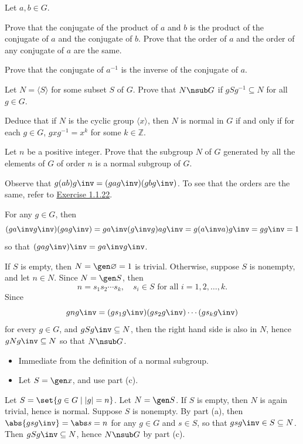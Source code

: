 \newpage

\begin{exercise}\label{ex3.1.26} 
    Let $a,b \in G$.
    \begin{subproblems}
        \item Prove that the conjugate of the product of $a$ and $b$ is the product of the conjugate of $a$ and the conjugate of $b$. Prove that the order of $a$ and the order of any conjugate of $a$ are the same.
        \item Prove that the conjugate of $a^{-1}$ is the inverse of the conjugate of $a$.
        \item Let $N = \langle S \rangle$ for some subset $S$ of $G$. Prove that $N \nsub G$ if $gSg^{-1} \subseteq N$ for all $g \in G$.
        \item Deduce that if $N$ is the cyclic group $\langle x \rangle$, then $N$ is normal in $G$ if and only if for each $g \in G$, $gxg^{-1} = x^k$ for some $k \in \mathbb{Z}$.
        \item Let $n$ be a positive integer. Prove that the subgroup $N$ of $G$ generated by all the elements of $G$ of order $n$ is a normal subgroup of $G$.
    \end{subproblems}
\end{exercise}

\begin{solalph}
    \item Observe that $g(ab)g\inv = (gag\inv)(gbg\inv)$. To see that the orders are the same, refer to \hyperref[ex1.1.22]{Exercise 1.1.22}.
    \item For any $g \in G$, then
    \[(ga\inv g\inv)(gag\inv) = ga\inv (g\inv g) ag\inv = g(a\inv a)g\inv = gg\inv = 1\]
    so that $(gag\inv)\inv = ga\inv g\inv$.
    \item If $S$ is empty, then $N = \gen\varnothing = 1$ is trivial. Otherwise, suppose $S$ is nonempty, and let $n \in N$. Since $N = \gen S$, then
    \[n = s_1s_2 \cdots s_k, \quad s_i \in S \text{ for all } i = 1, 2, \ldots, k.\]
    Since
    \[gng\inv = (gs_1g\inv)(gs_2g\inv) \cdots (gs_kg\inv)\]
    for every $g \in G$, and $gSg\inv \subseteq N$, then the right hand side is also in $N$, hence $gNg\inv \subseteq N$ so that $N \nsub G$.
    \item
    \begin{itemize}
        \item[\rightimp] Immediate from the definition of a normal subgroup.
        \item[\leftimp] Let $S = \gen x$, and use part (c).
    \end{itemize}
    \item Let $S = \set{g \in G \mid |g| = n}$. Let $N = \gen S$. If $S$ is empty, then $N$ is again trivial, hence is normal. Suppose $S$ is nonempty. By part (a), then $\abs{gsg\inv} = \abs s = n$ for any $g \in G$ and $s \in S$, so that $gsg\inv \in S \subseteq N$. Then $gSg\inv \subseteq N$, hence $N \nsub G$ by part (c).
\end{solalph}

